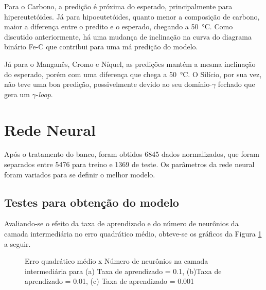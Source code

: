 \documentclass[brazil,tf,epusp]{usp}  %
\begin{document}
Para o Carbono, a predição é próxima do esperado, principalmente para hipereutetóides. Já para hipoeutetóides, quanto menor a composição de carbono, maior a diferença entre o predito e o esperado, chegando a \SI{50}{\celsius}. Como discutido anteriormente, há uma mudança de inclinação na curva do diagrama binário Fe-C que contribui para uma má predição do modelo.

Já para o Manganês, Cromo e Níquel, as predições mantém a mesma inclinação do esperado, porém com uma diferença que chega a \SI{50}{\celsius}. O Silício, por sua vez, não teve uma boa predição, possivelmente devido ao seu domínio-$\gamma$ fechado que gera um $\gamma$-\textit{loop}.

\section{Rede Neural}
Após o tratamento do banco, foram obtidos 6845 dados normalizados, que foram separados entre 5476 para treino e 1369 de teste. Os parâmetros da rede neural foram variados para se definir o melhor modelo.

\subsection{Testes para obtenção do modelo}

Avaliando-se o efeito da taxa de aprendizado e do número de neurônios da camada intermediária no erro quadrático médio, obteve-se os
gráficos da Figura \ref{fig:test_NN} a seguir.

\begin{figure}[!h]
\caption{Erro quadrático médio x Número de neurônios na camada intermediária para (a) Taxa de aprendizado = 0.1, (b)Taxa de aprendizado = 0.01, (c) Taxa de aprendizado = 0.001}
\label{fig:test_NN}
\end{figure}
\end{document}
